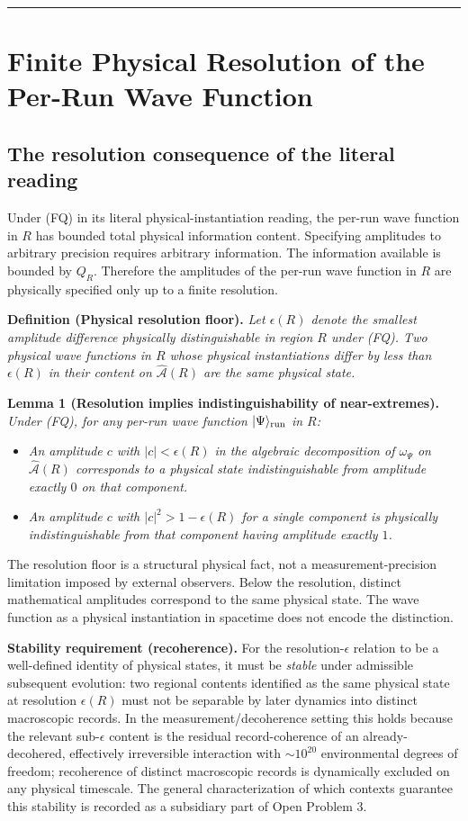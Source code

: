 \documentclass[11pt,a4paper]{article}
\begin{document}
\medskip\hrule\medskip

\section{Finite Physical Resolution of the Per-Run Wave Function}

\subsection{The resolution consequence of the literal reading}

Under (FQ) in its literal physical-instantiation reading, the per-run wave function in $R$ has bounded total physical information content. Specifying amplitudes to arbitrary precision requires arbitrary information. The information available is bounded by $Q_R$. Therefore the amplitudes of the per-run wave function in $R$ are physically specified only up to a finite resolution.

\textbf{Definition (Physical resolution floor).} \emph{Let $\epsilon(R)$ denote the smallest amplitude difference physically distinguishable in region $R$ under (FQ). Two physical wave functions in $R$ whose physical instantiations differ by less than $\epsilon(R)$ in their content on $\hat{\mathcal{A}}(R)$ are the same physical state.}

\textbf{Lemma 1 (Resolution implies indistinguishability of near-extremes).} \emph{Under (FQ), for any per-run wave function $|\Psi\rangle_{\rm run}$ in $R$:}
\begin{itemize}
  \item \emph{An amplitude $c$ with $|c| < \epsilon(R)$ in the algebraic decomposition of $\omega_\Psi$ on $\hat{\mathcal{A}}(R)$ corresponds to a physical state indistinguishable from amplitude exactly $0$ on that component.}
  \item \emph{An amplitude $c$ with $|c|^2 > 1 - \epsilon(R)$ for a single component is physically indistinguishable from that component having amplitude exactly $1$.}
\end{itemize}

The resolution floor is a structural physical fact, not a measurement-precision limitation imposed by external observers. Below the resolution, distinct mathematical amplitudes correspond to the same physical state. The wave function as a physical instantiation in spacetime does not encode the distinction.

\textbf{Stability requirement (recoherence).} For the resolution-$\epsilon$ relation to be a well-defined identity of physical states, it must be \emph{stable} under admissible subsequent evolution: two regional contents identified as the same physical state at resolution $\epsilon(R)$ must not be separable by later dynamics into distinct macroscopic records. In the measurement/decoherence setting this holds because the relevant sub-$\epsilon$ content is the residual record-coherence of an already-decohered, effectively irreversible interaction with $\sim 10^{20}$ environmental degrees of freedom; recoherence of distinct macroscopic records is dynamically excluded on any physical timescale. The general characterization of which contexts guarantee this stability is recorded as a subsidiary part of Open Problem 3.
\end{document}
